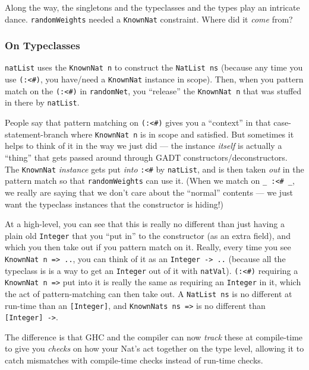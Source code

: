 \documentclass[]{article}
\begin{document}
Along the way, the singletons and the typeclasses and the types play an
intricate dance. \texttt{randomWeights} needed a \texttt{KnownNat} constraint.
Where did it \emph{come} from?

\subsubsection{On Typeclasses}\label{on-typeclasses}

\texttt{natList} uses the \texttt{KnownNat\ n} to construct the
\texttt{NatList\ ns} (because any time you use \texttt{(:\textless{}\#)}, you
have/need a \texttt{KnownNat} instance in scope). Then, when you pattern match
on the \texttt{(:\textless{}\#)} in \texttt{randomNet}, you ``release'' the
\texttt{KnownNat\ n} that was stuffed in there by \texttt{natList}.

People say that pattern matching on \texttt{(:\textless{}\#)} gives you a
``context'' in that case-statement-branch where \texttt{KnownNat\ n} is in scope
and satisfied. But sometimes it helps to think of it in the way we just did ---
the instance \emph{itself} is actually a ``thing'' that gets passed around
through GADT constructors/deconstructors. The \texttt{KnownNat} \emph{instance}
gets put \emph{into} \texttt{:\textless{}\#} by \texttt{natList}, and is then
taken \emph{out} in the pattern match so that \texttt{randomWeights} can use it.
(When we match on \texttt{\_\ :\textless{}\#\ \_}, we really are saying that we
don't care about the ``normal'' contents --- we just want the typeclass
instances that the constructor is hiding!)

At a high-level, you can see that this is really no different than just having a
plain old \texttt{Integer} that you ``put in'' to the constructor (as an extra
field), and which you then take out if you pattern match on it. Really, every
time you see \texttt{KnownNat\ n\ =\textgreater{}\ ..}, you can think of it as
an \texttt{Integer\ -\textgreater{}\ ..} (because all the typeclass is is a way
to get an \texttt{Integer} out of it with \texttt{natVal}).
\texttt{(:\textless{}\#)} requiring a \texttt{KnownNat\ n\ =\textgreater{}} put
into it is really the same as requiring an \texttt{Integer} in it, which the act
of pattern-matching can then take out. A \texttt{NatList\ ns} is no different at
run-time than an \texttt{{[}Integer{]}}, and
\texttt{KnownNats\ ns\ =\textgreater{}} is no different than
\texttt{{[}Integer{]}\ -\textgreater{}}.

The difference is that GHC and the compiler can now \emph{track} these at
compile-time to give you \emph{checks} on how your Nat's act together on the
type level, allowing it to catch mismatches with compile-time checks instead of
run-time checks.
\end{document}

